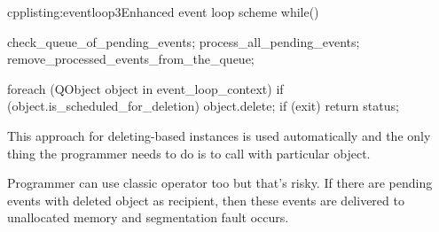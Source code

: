 \begin{fdoccode}{cpp}{listing:eventloop3}{Enhanced event loop scheme}
while() {
	check_queue_of_pending_events;
	process_all_pending_events;
	remove_processed_events_from_the_queue;
	
	foreach (QObject object in event_loop_context) {
		if (object.is_scheduled_for_deletion) {
			object.delete;
		}
	}
	if (exit) {
		return status;
	}
}
\end{fdoccode}

This approach for deleting-based instances is used automatically and the only thing the programmer needs to do is to call with particular object.

Programmer can use classic operator too but that's risky. If there are pending events with deleted object as recipient, then these events are delivered to unallocated memory and segmentation fault occurs.



